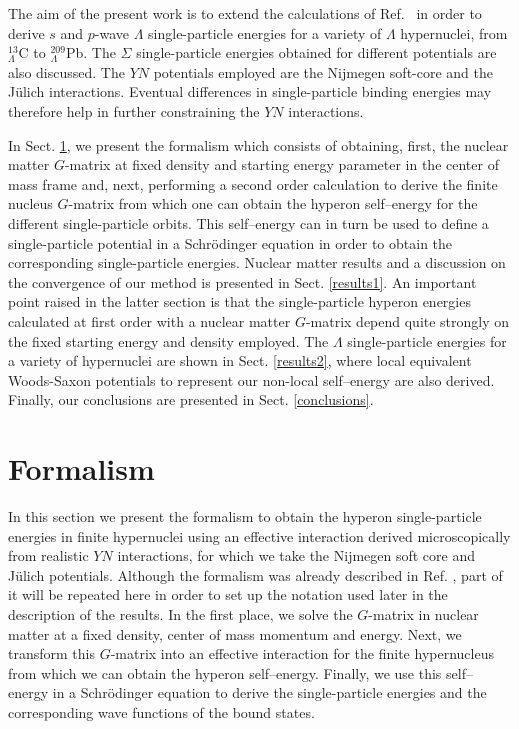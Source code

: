 The aim of the present work is 
to extend the calculations 
of Ref.\ \cite{hjort96} in order to derive 
$s$ and $p$-wave $\Lambda$ single-particle energies for a variety of
$\Lambda$ hypernuclei, from $^{13}_{\Lambda}$C 
to $^{209}_{\Lambda}$Pb. The $\Sigma$ single-particle energies obtained for 
different potentials are also
discussed. The $YN$ potentials employed are the Nijmegen soft-core
\cite{nijmegen} and the J\"ulich \cite{juelich} interactions.
Eventual  differences in single-particle binding energies  
may therefore help in further constraining the $YN$ interactions.


In Sect. \ref{formal}, we present the formalism which consists of
obtaining, first, the nuclear matter $G$-matrix at fixed density and
starting energy parameter in the center of mass frame and, next,
performing a
second order calculation to derive the finite nucleus $G$-matrix from
which one can obtain the hyperon self--energy for the different
single-particle 
orbits.
This self--energy can in turn be used to define a single-particle
potential in
a Schr\"odinger equation in order to obtain the corresponding single-particle
energies. Nuclear matter results and a discussion on the
convergence of our
method is presented in Sect. \ref{results1}. An important point raised in
the latter section is that the single-particle hyperon energies calculated
at first order with a nuclear matter $G$-matrix depend quite strongly on 
the fixed starting energy and density employed. The $\Lambda$
single-particle 
energies for a variety of
hypernuclei are shown in Sect. \ref{results2}, where local
equivalent Woods-Saxon potentials to represent our non-local
self--energy are also derived. Finally, our conclusions are presented in
Sect. \ref{conclusions}.   




\section{Formalism}
\label{formal}
In this section we present the formalism to obtain the hyperon single-particle
energies in finite hypernuclei using an effective interaction
derived microscopically from realistic $YN$ interactions, for which we 
take the Nijmegen soft core \cite{nijmegen} and J\"ulich\cite{juelich} 
potentials. 
Although the formalism was already described in Ref. \cite{hjort96}, 
part of it will be repeated here in order to set up the notation used 
later in the description of the results.
In the first place, we solve the $G$-matrix in nuclear matter at a
fixed density, center of mass momentum and
energy. Next, we transform this $G$-matrix into an effective
interaction for the finite hypernucleus from which we can obtain the
hyperon self--energy. Finally, we use this self--energy in a Schr\"odinger
equation to derive the single-particle energies and the corresponding
wave functions of the bound states. 

